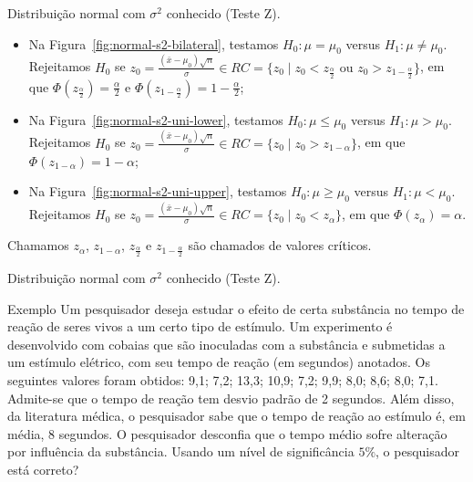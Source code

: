 \documentclass[8pt]{beamer}
\begin{document}
\begin{frame}{Distribuição normal com $\sigma^2$ conhecido (Teste Z).}

\large

\begin{itemize}
	\item Na Figura~\ref{fig:normal-s2-bilateral}, testamos $H_0: \mu = \mu_0$ versus $H_1: \mu \neq \mu_0$. Rejeitamos $H_0$ se $z_0 = \frac{(\bar{x} - \mu_0)\sqrt{n}}{\sigma} \in \allowbreak RC=\{z_0 \mid z_0 < z_\frac{\alpha}{2} \mbox{ ou } z_0 > z_{1-\frac{\alpha}{2}} \}$, em que $\Phi\left( z_\frac{\alpha}{2} \right) = \frac{\alpha}{2}$ e $\Phi\left( z_{1-\frac{\alpha}{2}} \right) = 1- \frac{\alpha}{2}$;
	\vfill
	
	\item Na Figura~\ref{fig:normal-s2-uni-lower}, testamos $H_0: \mu \leq \mu_0$ versus $H_1: \mu > \mu_0$. Rejeitamos $H_0$ se $z_0 = \frac{(\bar{x} - \mu_0)\sqrt{n}}{\sigma} \in \allowbreak RC=\{z_0 \mid z_0 > z_{1-\alpha}  \}$, em que $\Phi\left( z_{1-\alpha} \right) =1- \alpha$;
	\vfill
	
	\item Na Figura~\ref{fig:normal-s2-uni-upper}, testamos $H_0: \mu \geq \mu_0$ versus $H_1: \mu < \mu_0$. Rejeitamos $H_0$ se $z_0 = \frac{(\bar{x} - \mu_0)\sqrt{n}}{\sigma} \in \allowbreak RC=\{z_0 \mid z_0 < z_{\alpha}  \}$, em que $\Phi\left( z_{\alpha} \right) = \alpha$.
\end{itemize}
Chamamos $z_\alpha$, $z_{1-\alpha}$, $z_\frac{\alpha}{2}$ e $z_{1-\frac{\alpha}{2}}$ são chamados de valores críticos.
\normalsize

\end{frame}


\begin{frame}{Distribuição normal com $\sigma^2$ conhecido (Teste Z).}

\large

\begin{block}{Exemplo}
Um pesquisador deseja estudar o efeito de certa substância no tempo de reação de seres vivos a um certo tipo de estímulo. 
Um experimento é desenvolvido com cobaias que são inoculadas com a substância e submetidas a um estímulo elétrico, com seu tempo de reação (em segundos) anotados. 
Os seguintes valores foram obtidos: 9,1; 7,2; 13,3; 10,9; 7,2; 9,9; 8,0; 8,6; 8,0; 7,1. Admite-se que o tempo de reação tem desvio padrão de 2 segundos. Além disso, da literatura médica, o pesquisador sabe que o tempo de reação ao estímulo é, em média, 8 segundos.
O pesquisador desconfia que o tempo médio sofre alteração por influência da substância. Usando um nível de significância $5\%$, o pesquisador está correto? 
\end{block}

\normalsize

\end{frame}
\end{document}
